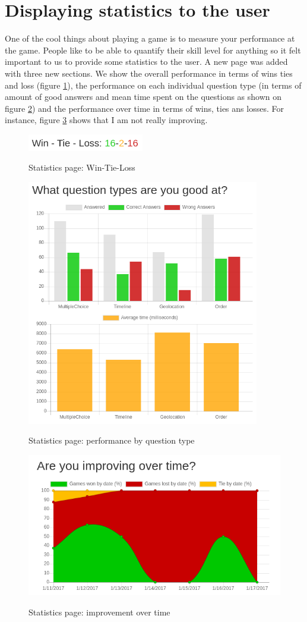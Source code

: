 \section{Displaying statistics to the user}
One of the cool things about playing a game is to measure your performance at the game. People like to be able to quantify their skill level for anything so it felt important to us to provide some statistics to the user. A new page was added with three new sections. We show the overall performance in terms of wins ties and loss (figure \ref{fig:statsWTL}), the performance on each individual question type (in terms of amount of good answers and mean time spent on the questions as shown on figure \ref{fig:statsQP}) and the performance over time in terms of wins, ties ans losses. For instance, figure \ref{fig:statsTI} shows that I am not really improving.
\begin{figure}
\centering
{\includegraphics[width=2in]{images/wtl.png}}
\caption{Statistics page: Win-Tie-Loss}
\label{fig:statsWTL}
\end{figure}
\begin{figure}
\centering
{\includegraphics[width=4in]{images/questions_perf.png}}
\caption{Statistics page: performance by question type}
\label{fig:statsQP}
\end{figure}
\begin{figure}
\centering
{\includegraphics[width=4.5in]{images/time_improv.png}}
\caption{Statistics page: improvement over time}
\label{fig:statsTI}
\end{figure}
